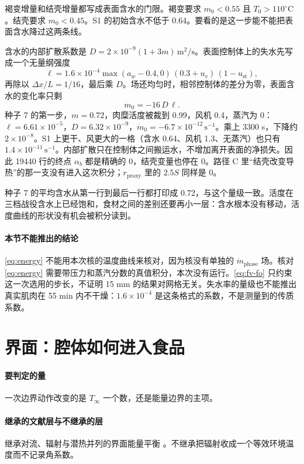褐变增量和结壳增量都写成表面含水的门限。褐变要求 \(m_0<0.55\) 且 \(T_0>110^\circ\mathrm{C}\)。结壳要求 \(m_0<0.45\)。S1 的初始含水不低于 0.64。要看的是这一步能不能把表面含水降过这两条线。

含水的内部扩散系数是 \(D=2\times 10^{-9}(1+3m)\,\mathrm{m}^2/\mathrm{s}\)。表面控制体上的失水先写成一个无量纲强度
\begin{equation}
\label{eq:mloss}
\ell=1.6\times 10^{-4}\max(a_w-0.4,0)\,(0.3+u_v)\,(1-u_{\mathrm{st}}),
\end{equation}
再除以 \(\Delta x/L=1/16\)，最后乘 \(D\)。场还均匀时，相邻控制体的差分为零，表面含水的变化率只剩
\[
\dot m_0=-16\,D\,\ell.
\]
种子 7 的第一步，\(m=0.72\)，肉糜活度被裁到 0.99，风机 0.4，蒸汽为 0：\(\ell=6.61\times 10^{-5}\)，\(D=6.32\times 10^{-9}\)，\(\dot m_0=-6.7\times 10^{-12}\,\mathrm{s}^{-1}\)。乘上 3300 s，下降约 \(2\times 10^{-8}\)。S1 上更干、风更大的一格（含水 0.64、风机 1.3、无蒸汽）也只有 \(1.4\times 10^{-11}\,\mathrm{s}^{-1}\)。内部扩散只在控制体之间搬运水，不增加离开表面的净损失。因此 19440 行的终点 \(\alpha_b\) 都是精确的 0，结壳变量也停在 0。路径 C 里“结壳改变导热”的那一支没有进入这次积分；\(r_{\mathrm{proxy}}\) 里的 \(2.5S\) 同样是 0。

种子 7 的平均含水从第一行到最后一行都打印成 0.72，与这个量级一致。活度在三档战役含水上已经饱和，食材之间的差别还要再小一层：含水根本没有移动，活度曲线的形状没有机会被积分读到。

\paragraph{本节不能推出的结论}
\eqref{eq:energy} 不能用本次核的温度曲线来核对，因为核没有单独的 \(\dot m_{\mathrm{phase}}\) 场。核对 \eqref{eq:energy} 需要带压力和蒸汽分数的真值积分，本次没有运行。\eqref{eq:fv-fo} 只约束这一次选用的步长，不证明 15 mm 的结果对网格无关。失水率的量级也不能推出真实肌肉在 55 min 内不干燥：\(1.6\times 10^{-4}\) 是这条格式的系数，不是测量到的传质系数。

\section{界面：腔体如何进入食品}

\paragraph{要判定的量}
一次边界动作改变的是 \(T_\infty\) 一个数，还是能量边界的主项。

\paragraph{继承的文献层与不继承的层}
继承对流、辐射与潜热并列的界面能量平衡 \cite{datta2007,feyissa2013}。不继承把辐射收成一个等效环境温度而不记录角系数。

